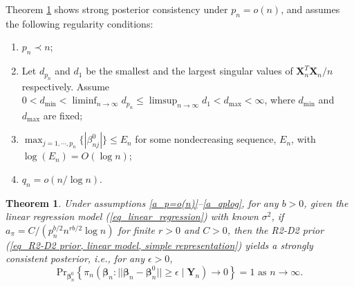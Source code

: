 \documentclass[12pt]{article}
\newtheorem{theorem}{Theorem}
\begin{document}
Theorem \ref{theorem_R2-D2_consistency} shows strong posterior consistency under $p_n = o(n)$, and assumes the  following regularity conditions:
\begin{enumerate} [label=(A\arabic*)]
	\item  \label{a_p=o(n)}    $p_n \prec n$;
	\item  \label{a_eigenvalues} Let $d_{p_n}$ and $d_1$ be the smallest and the largest singular values of $ { \bm{X}_n^T \bm{X}_n}/{n}$ respectively. Assume
	$0<d_{\min}<\liminf_{n\rightarrow\infty} d_{p_n} \leq \limsup_{n\rightarrow\infty}d_1 < d_{\max} <\infty$, where $d_{\min}$ and $d_{\max}$ are fixed;
	\item  \label{a_beta0_sup} $  \max_{j=1,\cdots,p_n} \{ |\beta_{nj}^0 | \} \leq E_n$ for some nondecreasing sequence, $E_n$, with $\log(E_n) = O(\log n)$;

	\item \label{a_qplog}  $q_n = o( n/ \log n)$.
\end{enumerate}
%
\begin{theorem} \label{theorem_R2-D2_consistency}
	Under assumptions \ref{a_p=o(n)}--\ref{a_qplog},  for any $b>0$, given the linear regression model (\ref{eq_linear_regression}) with known $\sigma^2$,  if  $a_{\pi}= C/( p_n^{b/2} n^{r b/2 }\log n)$  for finite $r>0$ and  $C>0$,  then the  R2-D2 prior   (\ref{eq_R2-D2 prior, linear model, simple representation})   yields a   strongly consistent posterior, i.e.,
	for any $\epsilon>0$,
	\[
	\text{Pr}_{\bm\beta^0_n}\left\{ \pi_n ( \bm{\beta}_n:|| \bm{\beta}_n- \bm{\beta}_n^0||\geq \epsilon \mid {\bm Y}_n)\rightarrow 0
 \right\} = 1	\text{  as $n\rightarrow \infty$.}
	\]


\end{theorem}
\end{document}
